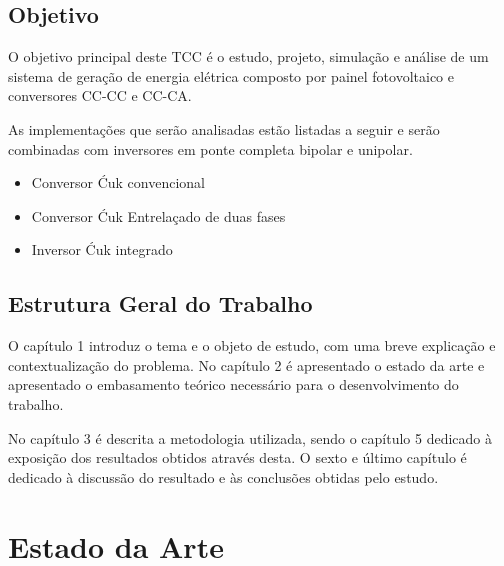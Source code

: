 \documentclass[
	12pt,				%
	openany,
	onseside,
	a4paper,			%
	english,			%
	french,				%
	spanish,			%
	brazil,				%
	]{abntex2}
\begin{document}
\section{Objetivo}

O objetivo principal deste TCC é o estudo, projeto, simulação e análise de um sistema de geração de energia elétrica composto por painel fotovoltaico e conversores CC-CC e CC-CA. 

As implementações que serão analisadas estão listadas a seguir e serão combinadas com inversores em ponte completa bipolar e unipolar.

\begin{itemize}
	
	\item Conversor Ćuk convencional
	\item Conversor Ćuk Entrelaçado de duas fases
	\item Inversor Ćuk integrado
	
\end{itemize}

\section{Estrutura Geral do Trabalho}

O capítulo 1 introduz o tema e o objeto de estudo, com uma breve explicação e contextualização do problema. No capítulo 2 é apresentado o estado da arte e apresentado o embasamento teórico necessário para o desenvolvimento do trabalho.

No capítulo 3 é descrita a metodologia utilizada, sendo o capítulo 5 dedicado à exposição dos resultados obtidos através desta. O sexto e último capítulo é dedicado à discussão do resultado e às conclusões obtidas pelo estudo.

\chapter{Estado da Arte}
\end{document}
